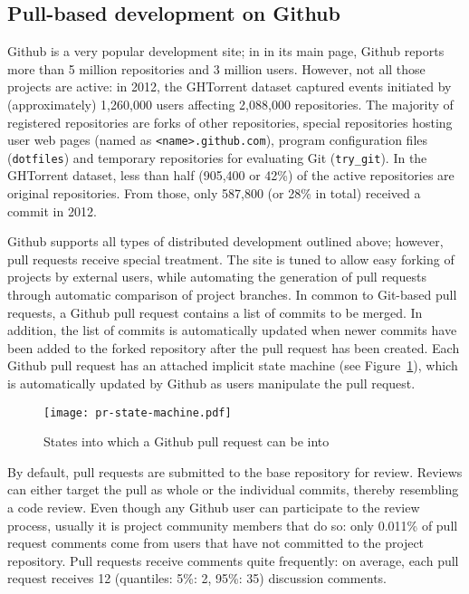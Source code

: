 \documentclass{sig-alternate}
\begin{document}
\subsection{Pull-based development on Github}

Github is a very popular development site; in in its main page, Github reports
more than 5 million repositories and 3 million users. However,  not all those
projects are active: in 2012, the GHTorrent dataset captured events initiated by
(approximately) 1,260,000 users affecting 2,088,000 repositories. The majority
of registered repositories are forks of other repositories, special repositories
hosting user web pages (named as \texttt{<name>.github.com}), program
configuration files (\texttt{dotfiles}) and temporary repositories for
evaluating Git (\texttt{try\_git}). In the GHTorrent dataset, less than half
(905,400 or 42\%) of the active repositories are original repositories. From
those, only 587,800 (or 28\% in total) received a commit in 2012.

Github supports all types of distributed development outlined above; however,
pull requests receive special treatment. The site is tuned to allow easy forking
of projects by external users, while automating the generation of pull
requests through automatic comparison of project branches. In common to
Git-based pull requests, a Github pull request contains a list of commits
to be merged. In addition, the list of commits is automatically updated when newer commits have been added to the forked repository after the pull request
has been created. Each Github pull request has an attached implicit state
machine (see Figure~\ref{fig:state}), which is automatically updated by
Github as users manipulate the pull request.

\begin{figure}
  \begin{center}
    \texttt{[image: pr-state-machine.pdf]}
  \end{center}
  \caption{States into which a Github pull request can be into}
  \label{fig:state}
\end{figure}

By default, pull requests are submitted to the base repository for review.
Reviews can either target the pull as whole or the individual commits,
thereby resembling a code review. 
Even though any Github user can participate to the
review process, usually it is project community members that do so:
only 0.011\% of pull request comments come from users that have not
committed to the project repository.
Pull requests receive comments quite frequently: on average, each pull
request receives 12 (quantiles: 5\%: 2, 95\%: 35) discussion comments.
\end{document}
